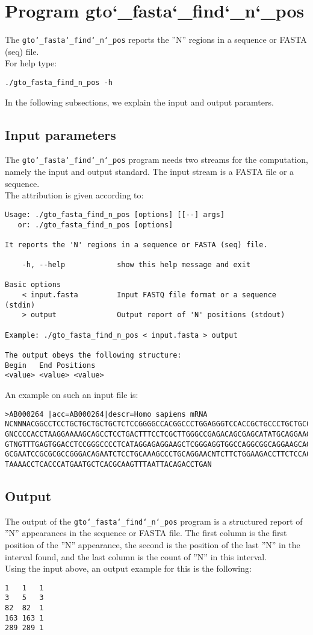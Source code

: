 \section{Program gto\char`_fasta\char`_find\char`_n\char`_pos}
The \texttt{gto\char`_fasta\char`_find\char`_n\char`_pos} reports the ''N'' regions in a sequence or FASTA (seq) file.\\
For help type:
\begin{lstlisting}
./gto_fasta_find_n_pos -h
\end{lstlisting}
In the following subsections, we explain the input and output paramters.

\subsection*{Input parameters}

The \texttt{gto\char`_fasta\char`_find\char`_n\char`_pos} program needs two streams for the computation, namely the input and output standard. The input stream is a FASTA file or a sequence.\\
The attribution is given according to:
\begin{lstlisting}
Usage: ./gto_fasta_find_n_pos [options] [[--] args]
   or: ./gto_fasta_find_n_pos [options]

It reports the 'N' regions in a sequence or FASTA (seq) file.

    -h, --help            show this help message and exit

Basic options
    < input.fasta         Input FASTQ file format or a sequence (stdin)
    > output              Output report of 'N' positions (stdout)

Example: ./gto_fasta_find_n_pos < input.fasta > output

The output obeys the following structure:
Begin	End	Positions
<value>	<value>	<value>
\end{lstlisting}
An example on such an input file is:
\begin{lstlisting}
>AB000264 |acc=AB000264|descr=Homo sapiens mRNA 
NCNNNACGGCCTCCTGCTGCTGCTGCTCTCCGGGGCCACGGCCCTGGAGGGTCCACCGCTGCCCTGCTGCCATTGTCCCC
GNCCCCACCTAAGGAAAAGCAGCCTCCTGACTTTCCTCGCTTGGGCCGAGACAGCGAGCATATGCAGGAAGCGGCAGGAA
GTNGTTTGAGTGGACCTCCGGGCCCCTCATAGGAGAGGAAGCTCGGGAGGTGGCCAGGCGGCAGGAAGCAGGCCAGTGCC
GCGAATCCGCGCGCCGGGACAGAATCTCCTGCAAAGCCCTGCAGGAACNTCTTCTGGAAGACCTTCTCCACCCCCCCAGC
TAAAACCTCACCCATGAATGCTCACGCAAGTTTAATTACAGACCTGAN
\end{lstlisting}

\subsection*{Output}
The output of the \texttt{gto\char`_fasta\char`_find\char`_n\char`_pos} program is a structured report of ''N'' appearances in the sequence or FASTA file. The first column is the first position of the ''N'' appearance, the second is the position of the last ''N'' in the interval found, and the last column is the count of ''N'' in this interval. \\
Using the input above, an output example for this is the following:
\begin{lstlisting}
1	1	1
3	5	3
82	82	1
163	163	1
289	289	1
\end{lstlisting}
